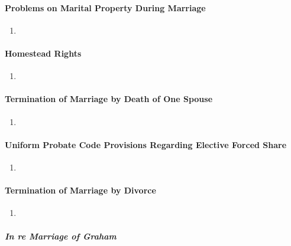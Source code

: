 \paragraph{Problems on Marital Property During Marriage}

\begin{enumerate}
    \item %
\end{enumerate}

\paragraph{Homestead Rights}

\begin{enumerate}
    \item %
\end{enumerate}

\paragraph{Termination of Marriage by Death of One Spouse}

\begin{enumerate}
    \item %
\end{enumerate}

\paragraph{Uniform Probate Code Provisions Regarding Elective Forced Share}

\begin{enumerate}
    \item %
\end{enumerate}

\paragraph{Termination of Marriage by Divorce}

\begin{enumerate}
    \item %
\end{enumerate}

\paragraph{\emph{In re Marriage of Graham}}

